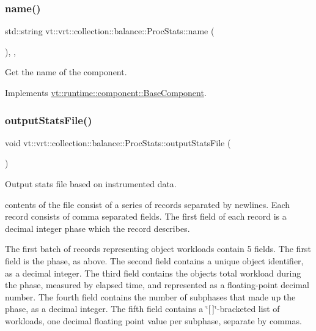 \subsubsection{\texorpdfstring{name()}{name()}}
{\footnotesize\ttfamily std\+::string vt\+::vrt\+::collection\+::balance\+::\+Proc\+Stats\+::name (\begin{DoxyParamCaption}{ }\end{DoxyParamCaption})\hspace{0.3cm}{\ttfamily [inline]}, {\ttfamily [override]}, {\ttfamily [virtual]}}



Get the name of the component. 



Implements \hyperlink{structvt_1_1runtime_1_1component_1_1_base_component_a7701485f3539f78d42e6bad47fc7eb78}{vt\+::runtime\+::component\+::\+Base\+Component}.

\mbox{\label{structvt_1_1vrt_1_1collection_1_1balance_1_1_proc_stats_a543211533c1c2c348137069e945432a5}} 
\subsubsection{\texorpdfstring{output\+Stats\+File()}{outputStatsFile()}}
{\footnotesize\ttfamily void vt\+::vrt\+::collection\+::balance\+::\+Proc\+Stats\+::output\+Stats\+File (\begin{DoxyParamCaption}{ }\end{DoxyParamCaption})}



Output stats file based on instrumented data. 

contents of the file consist of a series of records separated by newlines. Each record consists of comma separated fields. The first field of each record is a decimal integer phase which the record describes.

The first batch of records representing object workloads contain 5 fields. The first field is the phase, as above. The second field contains a unique object identifier, as a decimal integer. The third field contains the object\textquotesingle{}s total workload during the phase, measured by elapsed time, and represented as a floating-\/point decimal number. The fourth field contains the number of subphases that made up the phase, as a decimal integer. The fifth field contains a \char`\"{}\mbox{[}$\,$\mbox{]}\char`\"{}-\/bracketed list of workloads, one decimal floating point value per subphase, separate by commas.


